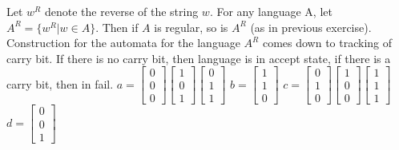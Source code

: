 \documentclass{article}
\begin{document}
{{{Let $w^R$ denote the reverse of the string $w$. For any language A, let $A^R = \{w^R | w\in A\}$.
Then if $A$ is regular, so is $A^R$ (as in previous exercise).
\\
Construction for the automata for the language $A^R$ comes down to tracking of carry bit. If there is no carry bit, 
then language is in accept state, if there is a carry bit, then in fail.
$a = 
\begin{bmatrix}
    0 \\
    0 \\
    0  
\end{bmatrix}
\begin{bmatrix}
    1 \\
    0 \\
    1  
\end{bmatrix}
\begin{bmatrix}
    0 \\
    1 \\
    1  
\end{bmatrix}
$
$b = 
\begin{bmatrix}
    1 \\
    1 \\
    0  
\end{bmatrix}
$
$c = 
\begin{bmatrix}
    0 \\
    1 \\
    0  
\end{bmatrix}
\begin{bmatrix}
    1 \\
    0 \\
    0  
\end{bmatrix}
\begin{bmatrix}
    1 \\
    1 \\
    1  
\end{bmatrix}
$
$d = 
\begin{bmatrix}
    0 \\
    0 \\
    1  
\end{bmatrix}
$
\begin{center}
\end{center}}}}
\end{document}

